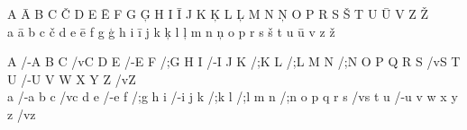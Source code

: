 \documentclass{scrreprt}
\begin{document}
A Ā B    C    Č    D    E    Ē    F    G    Ģ    H    I    Ī    J    K
   Ķ    L    Ļ    M    N    Ņ    O    P    R    S    Š    T    U    Ū
  V    Z    Ž\\
a    ā    b    c    č    d    e    ē    f    g    ģ    h    i    ī
j    k    ķ    l    ļ    m    n    ņ    o    p    r    s    š    t
u    ū    v    z    ž

A /-A B C /vC D E /-E F /;G H I /-I J K /;K L /;L M N /;N O P Q R S
/vS T U /-U V W X Y Z /vZ\\
a /-a b c /vc d e /-e f /;g h i /-i j k /;k l /;l m n /;n o p q r s
/vs t u /-u v w x y z /vz
\end{document}
